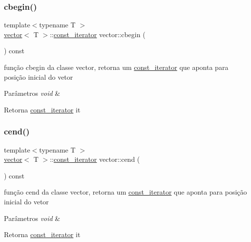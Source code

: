 \subsubsection{\texorpdfstring{cbegin()}{cbegin()}}
{\footnotesize\ttfamily template$<$typename T $>$ \\
\mbox{\hyperlink{classsc_1_1vector}{vector}}$<$ T $>$\+::\mbox{\hyperlink{classsc_1_1vector_1_1const__iterator}{const\+\_\+iterator}} vector\+::cbegin (\begin{DoxyParamCaption}\item[{void}]{ }\end{DoxyParamCaption}) const}

função cbegin da classe vector, retorna um \mbox{\hyperlink{classsc_1_1vector_1_1const__iterator}{const\+\_\+iterator}} que aponta para posição inicial do vetor 
\begin{DoxyParams}{Parâmetros}
{\em void} & \\
\hline
\end{DoxyParams}
\begin{DoxyReturn}{Retorna}
\mbox{\hyperlink{classsc_1_1vector_1_1const__iterator}{const\+\_\+iterator}} it 
\end{DoxyReturn}
\mbox{\label{classsc_1_1vector_aa6a2e50e9f3eec904cf6ec0f357c8180}} 
\subsubsection{\texorpdfstring{cend()}{cend()}}
{\footnotesize\ttfamily template$<$typename T $>$ \\
\mbox{\hyperlink{classsc_1_1vector}{vector}}$<$ T $>$\+::\mbox{\hyperlink{classsc_1_1vector_1_1const__iterator}{const\+\_\+iterator}} vector\+::cend (\begin{DoxyParamCaption}\item[{void}]{ }\end{DoxyParamCaption}) const}

função cend da classe vector, retorna um \mbox{\hyperlink{classsc_1_1vector_1_1const__iterator}{const\+\_\+iterator}} que aponta para posição inicial do vetor 
\begin{DoxyParams}{Parâmetros}
{\em void} & \\
\hline
\end{DoxyParams}
\begin{DoxyReturn}{Retorna}
\mbox{\hyperlink{classsc_1_1vector_1_1const__iterator}{const\+\_\+iterator}} it 
\end{DoxyReturn}
\mbox{\label{classsc_1_1vector_a8fe7985eb59c7ce5c1165184feebc939}} 
